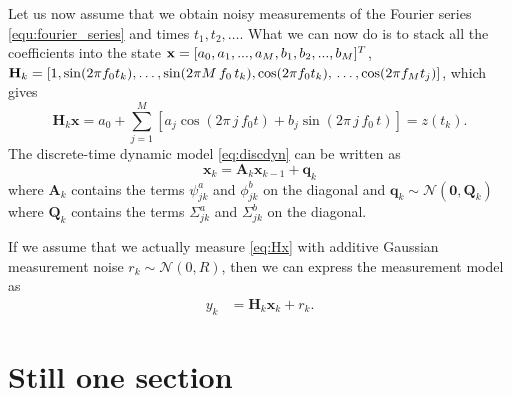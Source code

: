 \documentclass[portrait,a0,final]{a0poster} %
\begin{document}
\begin{minipage}{0.98\linewidth}
\begin{minipage}[t]{0.47\linewidth}
Let us now assume that we obtain noisy measurements of the Fourier series \eqref{equ:fourier_series} and times $t_1,t_2,\ldots$. What we can now do is to stack all the coefficients into the state $\mathbf{x} = [a_{0}, a_{1}, ..., a_{M}, b_{1}, b_{2}, ...\\, b_{M}]^T$, $\mathbf{H}_k = [1, \sin(2\pi f_0 t_k), \ldots, \sin(2\pi M \, f_0 \, t_k), \cos(2\pi f_0 t_k), \\\ldots, \cos(2\pi f_M t_j)]$, which gives
%
\begin{equation}
\mathbf{H}_k \mathbf{x}
= a_0 + \sum_{j=1}^{M} \left[ a_{j} \cos(2\pi \, j \, f_0 t) + b_{j} \sin(2\pi  \, j \, f_0 \, t) \right]
= z(t_k).
\label{eq:Hx}
\end{equation}
%
The discrete-time dynamic model \eqref{eq:discdyn} can be written as
%
\begin{equation}
\mathbf{x}_k = \mathbf{A}_{k} \mathbf{x}_{k-1} + \mathbf{q}_{k} 
\label{eq:dynmodel}
\end{equation}
%
where $\mathbf{A}_k$ contains the terms $\psi^a_{jk}$ and $\phi^b_{jk}$ on the diagonal and $ \mathbf{q}_{k} \sim \mathcal{N}(\mathbf{0},\mathbf{Q}_k)$ where $\mathbf{Q}_k$ contains the terms $\Sigma^a_{jk}$ and $\Sigma^b_{jk}$ on the diagonal.

If we assume that we actually measure \eqref{eq:Hx} with additive Gaussian measurement noise $r_k \sim \mathcal{N}(0,R)$, then we can express the measurement model as
%
\begin{equation}
\begin{split}
y_k &= \mathbf{H}_k \mathbf{x}_k + r_k.
\end{split}
\label{eq:measmodel}
\end{equation}



\end{minipage} %
\hspace{0.03\linewidth} %
\begin{minipage}[t]{0.47\linewidth}
\setlength{\parindent}{10mm} %








\section{Still one section}


\end{minipage}
\end{minipage}
\end{document}
